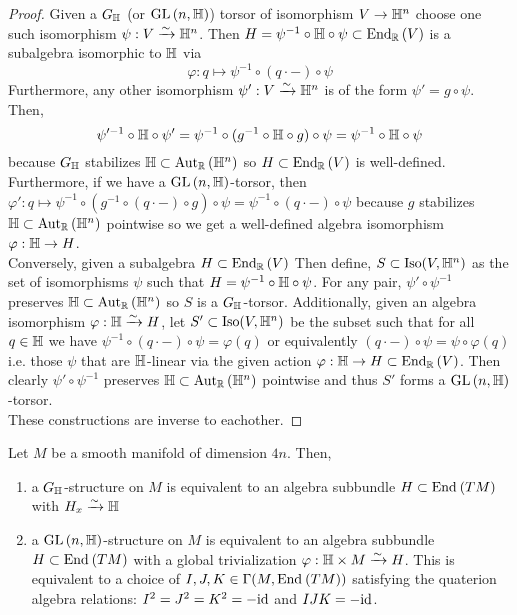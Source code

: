 \documentclass[12pt]{extarticle}
\newcommand{\R}{\mathbb{R}}
\begin{document}
\begin{proof}
Given a $G_{\mathbb{H}}$ (or $\mathrm{GL}\left(n, \mathbb{H} \right)$) torsor of isomorphism $V \to \mathbb{H}^n$ choose one such isomorphism $\psi : V \xrightarrow{\sim} \mathbb{H}^n$. Then $H = \psi^{-1} \circ \H \circ \psi \subset \End{\R}{V}$ is a subalgebra isomorphic to $\mathbb{H}$ via
\[ \varphi : q \mapsto \psi^{-1} \circ (q \cdot -) \circ \psi \]
Furthermore, any other isomorphism $\psi' : V \xrightarrow{\sim} \mathbb{H}^n$ is of the form $\psi' = g \circ \psi$. Then, 
\[ \psi'^{-1} \circ \mathbb{H} \circ \psi' = \psi^{-1} \circ (g^{-1} \circ \mathbb{H} \circ g) \circ \psi = \psi^{-1} \circ \mathbb{H} \circ \psi \]
because $G_{\mathbb{H}}$ stabilizes $\H \subset \Aut{\R}{\H^n}$ so $H \subset \End{\R}{V}$ is well-defined. Furthermore, if we have a $\mathrm{GL}\left(n, \mathbb{H} \right)$-torsor, then $\varphi' : q \mapsto \psi^{-1} \circ (g^{-1} \circ (q \cdot -) \circ g) \circ \psi = \psi^{-1} \circ (q \cdot -) \circ \psi$ because $g$ stabilizes $\H \subset \Aut{\R}{\H^n}$ pointwise so we get a well-defined algebra isomorphism $\varphi : \mathbb{H} \to H$.
\bigskip\\
Conversely, given a subalgebra $H \subset \End{\R}{V}$ Then define, $S \subset \mathrm{Iso}(V, \mathbb{H}^n)$ as the set of isomorphisms $\psi$ such that $H = \psi^{-1} \circ \mathbb{H} \circ \psi$. For any pair, $\psi' \circ \psi^{-1}$ preserves $\H \subset \Aut{\R}{\H^n}$ so $S$ is a $G_{\mathbb{H}}$-torsor. Additionally, given an algebra isomorphism $\varphi : \mathbb{H} \xrightarrow{\sim} H$, let $S' \subset \mathrm{Iso}(V, \mathbb{H}^n)$ be the subset such that for all $q \in \mathbb{H}$ we have $\psi^{-1} \circ (q \cdot -) \circ \psi = \varphi(q)$ or equivalently $(q \cdot -) \circ \psi = \psi \circ \varphi(q)$ i.e. those $\psi$ that are $\mathbb{H}$-linear via the given action $\varphi : \H \to H \subset \End{\R}{V}$. Then clearly $\psi' \circ \psi^{-1}$ preserves $\H \subset \Aut{\R}{\H^n}$ pointwise and thus $S'$ forms a $\mathrm{GL}\left(n, \mathbb{H} \right)$-torsor.
\bigskip\\
These constructions are inverse to eachother.
\end{proof}

\begin{theorem}
Let $M$ be a smooth manifold of dimension $4n$. Then,
\begin{enumerate}
\item a $G_{\mathbb{H}}$-structure on $M$ is equivalent to an algebra subbundle $H \subset \mathrm{End}_{}\left(TM\right)$ with $H_x \xrightarrow{\sim} \mathbb{H}$
\item a $\mathrm{GL}\left(n,\mathbb{H} \right)$-structure on $M$ is equivalent to an algebra subbundle $H \subset \mathrm{End}_{}\left(TM\right)$ with a global trivialization $\varphi : \mathbb{H} \times M \xrightarrow{\sim} H$. This is equivalent to a choice of $I, J, K \in \Gamma(M, \mathrm{End}_{}\left(TM\right))$ satisfying the quaterion algebra relations: $I^2 = J^2 = K^2 = -\mathrm{id}$ and $IJK = -\mathrm{id}$.
\end{enumerate}
\end{theorem}
\end{document}
